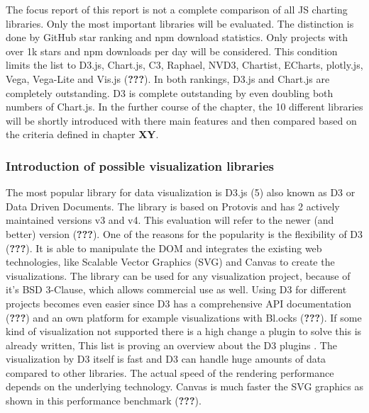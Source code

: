 \documentclass[american,a4paper,oneside,,tablecaptionabove]{scrbook}
\begin{document}
The focus report of this report is not a complete comparison of all JS
charting libraries. Only the most important libraries will be evaluated.
The distinction is done by GitHub star ranking and npm download
statistics. Only projects with over 1k stars and npm downloads per day
will be considered. This condition limits the list to D3.js, Chart.js,
C3, Raphael, NVD3, Chartist, ECharts, plotly.js, Vega, Vega-Lite and
Vis.js ({\textbf{???}}). In both rankings, D3.js and Chart.js are
completely outstanding. D3 is complete outstanding by even doubling both
numbers of Chart.js. In the further course of the chapter, the 10
different libraries will be shortly introduced with there main features
and then compared based on the criteria defined in chapter \textbf{XY}.

\subsubsection{Introduction of possible visualization
libraries}\label{introduction-of-possible-visualization-libraries}

The most popular library for data visualization is D3.js (5) also known
as D3 or Data Driven Documents. The library is based on Protovis and has
2 actively maintained versions v3 and v4. This evaluation will refer to
the newer (and better) version ({\textbf{???}}). One of the reasons for
the popularity is the flexibility of D3 ({\textbf{???}}). It is able to
manipulate the DOM and integrates the existing web technologies, like
Scalable Vector Graphics (SVG) and Canvas to create the visualizations.
The library can be used for any visualization project, because of it's
BSD 3-Clause, which allows commercial use as well. Using D3 for
different projects becomes even easier since D3 has a comprehensive API
documentation ({\textbf{???}}) and an own platform for example
visualizations with Bl.ocks ({\textbf{???}}). If some kind of
visualization not supported there is a high change a plugin to solve
this is already written, This list is proving an overview about the D3
plugins \cite{awesome-d3}. The visualization by D3 itself is fast and D3
can handle huge amounts of data compared to other libraries. The actual
speed of the rendering performance depends on the underlying technology.
Canvas is much faster the SVG graphics as shown in this performance
benchmark ({\textbf{???}}).
\end{document}
